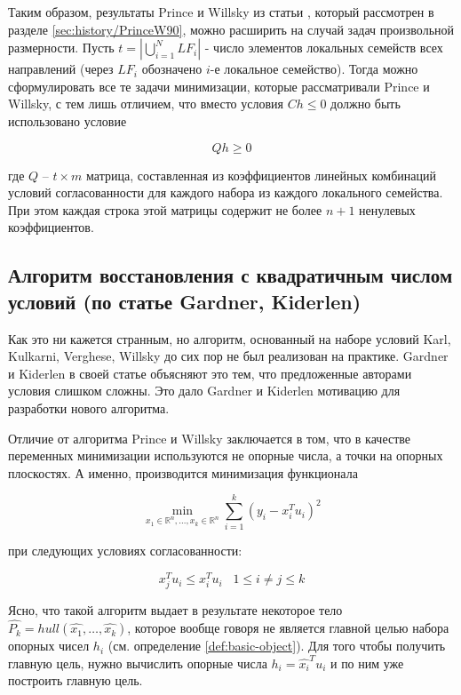 \documentclass[a4paper, 12pt, titlepage]{article}
\theoremstyle{definition}
\theoremstyle{plain}
\theoremstyle{plain}
\begin{document}
Таким образом, результаты Prince и Willsky из
статьи \cite{journals/pami/PrinceW90}, который рассмотрен в разделе
\ref{sec:history/PrinceW90}, можно расширить на случай задач произвольной
размерности. Пусть $t = |\bigcup \limits_{i = 1}^{N} LF_{i}|$ - число элементов
локальных семейств всех направлений (через $LF_{i}$ обозначено $i$-е локальное 
семейство). Тогда можно сформулировать все те задачи минимизации, которые
рассматривали Prince и Willsky, с тем лишь отличием, что вместо условия
$Ch \leq 0$ должно быть использовано условие

\begin{equation}
 Q h \geq 0
\end{equation}

где $Q$ -- $t \times m$ матрица, составленная из коэффициентов линейных
комбинаций условий согласованности для каждого набора из каждого локального
семейства. При этом каждая строка этой матрицы содержит не более $n + 1$
ненулевых коэффициентов.

\newpage
\subsection{Алгоритм восстановления с квадратичным числом условий (по статье
Gardner, Kiderlen)}

Как это ни кажется странным, но алгоритм, основанный на наборе условий Karl,
Kulkarni, Verghese, Willsky до сих пор не был реализован на практике. Gardner и
Kiderlen в своей статье \cite{journals/pami/GardnerK09} объясняют это тем, что
предложенные авторами условия слишком сложны. Это дало Gardner и Kiderlen 
мотивацию для разработки нового алгоритма.

Отличие от алгоритма Prince и Willsky заключается в том, что в качестве 
переменных минимизации используются не опорные числа, а точки на опорных 
плоскостях. А именно, производится минимизация функционала

\begin{equation}
 \min_{x_{1} \in \mathbb{R}^{n}, \ldots, x_{k} \in \mathbb{R}^{n}}
 \sum \limits_{i = 1}^{k} (y_{i} - x_{i}^{T} u_{i})^{2}
\end{equation}

при следующих условиях согласованности:

\begin{equation}
 x_{j}^{T} u_{i} \leq x_{i}^{T} u_{i} \;\;\; 1 \leq i \neq j \leq k
\end{equation}

Ясно, что такой алгоритм выдает в результате некоторое тело
$\widehat{P_{k}} = hull(\widehat{x_{1}}, \ldots, \widehat{x_{k}})$, которое
вообще говоря не является главной целью набора опорных чисел $h_{i}$ (см. 
определение \ref{def:basic-object}). Для того чтобы получить главную цель, 
нужно вычислить опорные числа $h_{i} = \widehat{x_{i}}^{T} u_{i}$ и по ним уже 
построить главную цель.
\end{document}
